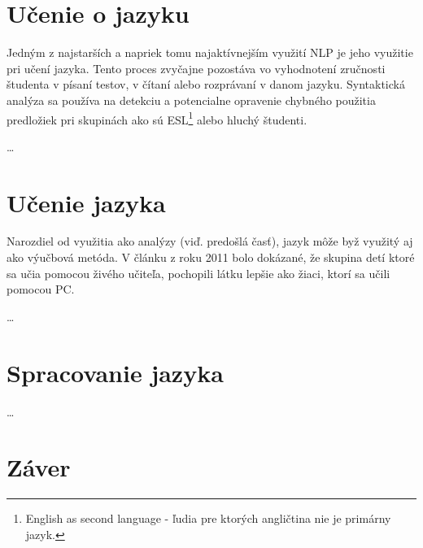 \documentclass[10pt,twoside,slovak,a4paper]{article}
\begin{document}
\section{Učenie o jazyku} \label{ucenie_jazyka}
Jedným z najstarších a napriek tomu najaktívnejším využití NLP je jeho využitie pri učení jazyka.
Tento proces zvyčajne pozostáva vo vyhodnotení zručnosti študenta v písaní testov, v čítaní alebo
rozprávaní v danom jazyku. Syntaktická analýza sa používa na detekciu a potencialne opravenie chybného použitia
predložiek pri skupinách ako sú ESL\footnote{English as second language - ľudia pre ktorých angličtina nie je primárny jazyk.} alebo hluchý študenti.

\ldots

\section{Učenie jazyka} \label{ucenie_pomocou_nlp}
Narozdiel od využitia ako analýzy (viď. predošlá časť), jazyk môže byž využitý aj ako výučbová metóda.
V článku z roku 2011\cite{clanok_o_studovani} bolo dokázané, že skupina detí ktoré sa učia pomocou živého učiteľa, pochopili látku lepšie ako žiaci,
ktorí sa učili pomocou PC.


\ldots

\section{Spracovanie jazyka} \label{spracovanie_jazyka}

\ldots


\section{Záver} \label{zaver} %




 
\end{document}
